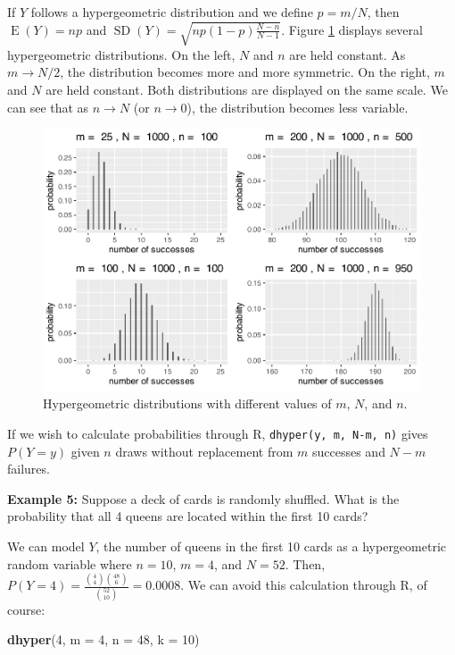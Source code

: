 \documentclass[
]{krantz}
\newenvironment{Shaded}{\begin{snugshade}}{\end{snugshade}}
\newcommand{\DataTypeTok}[1]{\textcolor[rgb]{0.27,0.27,0.27}{#1}}
\newcommand{\DecValTok}[1]{\textcolor[rgb]{0.06,0.06,0.06}{#1}}
\newcommand{\KeywordTok}[1]{\textcolor[rgb]{0.27,0.27,0.27}{\textbf{#1}}}
\newcommand{\NormalTok}[1]{#1}
\newcommand{\E}{\operatorname{E}}
\newcommand{\SD}{\operatorname{SD}}
\begin{document}
If \(Y\) follows a hypergeometric distribution and we define \(p = m/N\), then \(\E(Y) = np\) and \(\SD(Y) = \sqrt{np(1-p)\frac{N-n}{N-1}}\). Figure \ref{fig:multHyper} displays several hypergeometric distributions. On the left, \(N\) and \(n\) are held constant. As \(m \rightarrow N/2\), the distribution becomes more and more symmetric. On the right, \(m\) and \(N\) are held constant. Both distributions are displayed on the same scale. We can see that as \(n \rightarrow N\) (or \(n \rightarrow 0\)), the distribution becomes less variable.



\begin{figure}

{\centering \includegraphics[width=0.6\linewidth]{bookdown-BeyondMLR_files/figure-latex/multHyper-1} 

}

\caption{Hypergeometric distributions with different values of \(m\), \(N\), and \(n\).}\label{fig:multHyper}
\end{figure}

If we wish to calculate probabilities through R, \texttt{dhyper(y,\ m,\ N-m,\ n)} gives \(P(Y=y)\) given \(n\) draws without replacement from \(m\) successes and \(N-m\) failures.

\textbf{Example 5:} Suppose a deck of cards is randomly shuffled. What is the probability that all 4 queens are located within the first 10 cards?

We can model \(Y\), the number of queens in the first 10 cards as a hypergeometric random variable where \(n = 10\), \(m = 4\), and \(N = 52\). Then, \(P(Y=4) = \displaystyle \frac{\binom{4}{4}\binom{48}{6}}{\binom{52}{10}} = 0.0008\). We can avoid this calculation through R, of course:

\begin{Shaded}
\begin{Highlighting}[]
\KeywordTok{dhyper}\NormalTok{(}\DecValTok{4}\NormalTok{, }\DataTypeTok{m =} \DecValTok{4}\NormalTok{, }\DataTypeTok{n =} \DecValTok{48}\NormalTok{, }\DataTypeTok{k =} \DecValTok{10}\NormalTok{)}
\end{Highlighting}
\end{Shaded}
\end{document}
